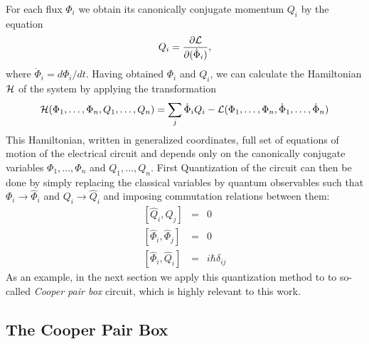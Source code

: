 %
For each flux $\Phi_i$ we obtain its canonically conjugate momentum $Q_i$ by the equation
%
\begin{equation}
Q_i = \frac{\partial \begin{mathcal}L\end{mathcal}}{\partial(\dot{\Phi}_i)}, \label{eq:canonical_momentum}
\end{equation}
%
where $\dot{\Phi}_i=d\Phi_i/dt$. Having obtained $\Phi_i$ and $Q_i$, we can calculate the Hamiltonian $\begin{mathcal}H\end{mathcal}$ of the system by applying the transformation
%
\begin{equation}
\begin{mathcal}H\end{mathcal}(\Phi_1,\hdots,\Phi_n,Q_1,\hdots,Q_n) = \sum\limits_j \dot{\Phi}_i Q_i - \begin{mathcal}L\end{mathcal}(\Phi_1,\hdots,\Phi_n,\dot{\Phi}_1,\hdots,\dot{\Phi}_n) \label{eq:l_to_h}
\end{equation}
%
This Hamiltonian, written in generalized coordinates, full set of equations of motion of the electrical circuit and depends only on the canonically conjugate variables $\Phi_{1},\hdots,\Phi_n$ and $Q_1,\hdots,Q_n$. First Quantization of the circuit can then be done by simply replacing the classical variables by quantum observables such that $\Phi_i\to\hat{\Phi}_i$ and $Q_i\to\hat{Q}_i$ and imposing commutation relations between them:
%
\begin{eqnarray}
\left[\hat{Q}_i,\hat{Q}_j\right] & = & 0 \\
\left[\hat{\Phi}_i,\hat{\Phi}_j \right] & = & 0 \\
\left[\hat{\Phi}_i,\hat{Q}_i\right] & = & i\hbar\delta_{ij} \label{eq:quantization_commutation_relations}
\end{eqnarray}
%
As an example, in the next section we apply this quantization method to to so-called {\it Cooper pair box} circuit, which is highly relevant to this work.

\subsection{The Cooper Pair Box}

